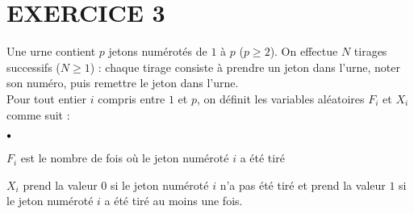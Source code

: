 \documentclass[11pt]{article}%
\begin{document}
\section*{EXERCICE 3}

Une urne contient $p$ jetons numérotés de $1$ à $p$ ($p\geq 2$). On
effectue $N$ tirages successifs ($N\geq 1$) : chaque tirage consiste à
prendre un jeton dans l'urne, noter son numéro, puis remettre le jeton
dans
l'urne.\\
Pour tout entier $i$ compris entre $1$ et $p$, on définit les variables
aléatoires $F_{i}$ et $X_{i}$ comme suit :

\begin{noliste}{$\scriptstyle \bullet$}
\item $F_{i}$ est le nombre de fois où le jeton numéroté $i$ a été tiré

\item $X_{i}$ prend la valeur $0$ si le jeton numéroté $i$ n'a pas été
tiré
et prend la valeur $1$ si le jeton numéroté $i$ a été tiré au moins une
fois.
\end{noliste}
\end{document}
